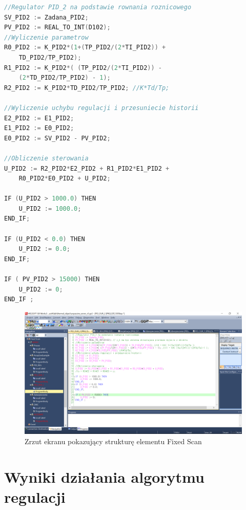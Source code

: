 \begin{lstlisting}[caption={Kod drugiego jednowymiarowego regulatora PID}, language=C]
//Regulator PID_2 na podstawie rownania roznicowego
SV_PID2 := Zadana_PID2;
PV_PID2 := REAL_TO_INT(D102);  
//Wyliczenie parametrow
R0_PID2 := K_PID2*(1+(TP_PID2/(2*TI_PID2)) + 
    TD_PID2/TP_PID2);
R1_PID2 := K_PID2*( (TP_PID2/(2*TI_PID2)) - 
    (2*TD_PID2/TP_PID2) - 1); 
R2_PID2 := K_PID2*TD_PID2/TP_PID2; //K*Td/Tp;

//Wyliczenie uchybu regulacji i przesuniecie historii
E2_PID2 := E1_PID2;
E1_PID2 := E0_PID2;
E0_PID2 := SV_PID2 - PV_PID2;

//Obliczenie sterowania
U_PID2 := R2_PID2*E2_PID2 + R1_PID2*E1_PID2 + 
    R0_PID2*E0_PID2 + U_PID2;

IF (U_PID2 > 1000.0) THEN
	U_PID2 := 1000.0;
END_IF;

IF (U_PID2 < 0.0) THEN
	U_PID2 := 0.0;
END_IF;

IF ( PV_PID2 > 15000) THEN
	U_PID2 := 0;
END_IF ;

\end{lstlisting}

\begin{figure}[H]
\setlength{\leftskip}{-1.5cm}
\includegraphics[scale=0.45]{sections/thermal/DrzewkoZFolderami.png}
\caption{Zrzut ekranu pokazujący strukturę elementu Fixed Scan}
\end{figure}


\section{Wyniki działania algorytmu regulacji}
\label{thermal_pid_wyniki}

